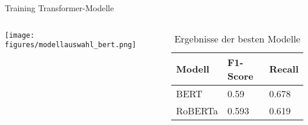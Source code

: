 \documentclass[aspectratio=169]{beamer} %
\begin{document}
\begin{frame}{Training Transformer-Modelle}

\begin{columns}  %

\begin{column}{0.4\textwidth}
    \centering
    \texttt{[image: figures/modellauswahl\_bert.png]}
\end{column}

\begin{column}{0.6\textwidth}
    \raggedright  %
    \hspace{-2.5cm}  %
    \begin{table}
        \renewcommand{\arraystretch}{1.2}  %
        \begin{tabular}{|p{2cm}|p{2cm}|p{2cm}|}  %
            \hline
            \textbf{Modell} & \textbf{F1-Score} & \textbf{Recall} \\
            \hline
            BERT & 0.59	& 0.678 \\
            RoBERTa & 0.593 & 0.619 \\
            \hline
        \end{tabular}
        \caption{Ergebnisse der besten Modelle}
        \label{tab:model_performance}
    \end{table}
\end{column}

\end{columns}  %
\end{frame}
\end{document}
